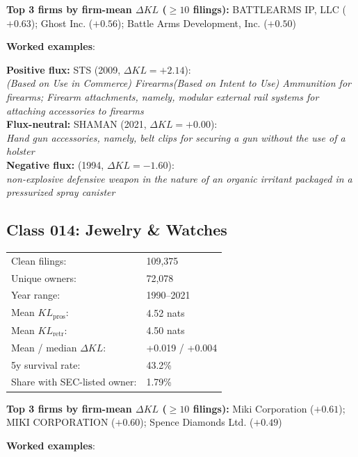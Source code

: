 \textbf{Top 3 firms by firm-mean $\Delta KL$ ($\geq 10$ filings):} BATTLEARMS IP, LLC ($+0.63$); Ghost Inc. ($+0.56$); Battle Arms Development, Inc. ($+0.50$)

\textbf{Worked examples}:

  \textbf{Positive flux:} \textsc{STS} (2009, $\Delta KL=+2.14$):\\
  \textit{(Based on Use in Commerce) Firearms(Based on Intent to Use) Ammunition for firearms; Firearm attachments, namely, modular external rail systems for attaching accessories to firearms}\\
  \textbf{Flux-neutral:} \textsc{SHAMAN} (2021, $\Delta KL=+0.00$):\\
  \textit{Hand gun accessories, namely, belt clips for securing a gun without the use of a holster}\\
  \textbf{Negative flux:} \textsc{} (1994, $\Delta KL=-1.60$):\\
  \textit{non-explosive defensive weapon in the nature of an organic irritant packaged in a pressurized spray canister}\\

\subsection*{Class 014: Jewelry \& Watches}
\label{app:industry-014}

\begin{tabular}{ll}
Clean filings: & 109,375 \\
Unique owners: & 72,078 \\
Year range: & 1990--2021 \\
Mean $KL_\text{pros}$: & 4.52 nats \\
Mean $KL_\text{retr}$: & 4.50 nats \\
Mean / median $\Delta KL$: & +0.019 / +0.004 \\
5y survival rate: & 43.2\% \\
Share with SEC-listed owner: & 1.79\% \\
\end{tabular}

\textbf{Top 3 firms by firm-mean $\Delta KL$ ($\geq 10$ filings):} Miki Corporation ($+0.61$); MIKI CORPORATION ($+0.60$); Spence Diamonds Ltd. ($+0.49$)

\textbf{Worked examples}:

